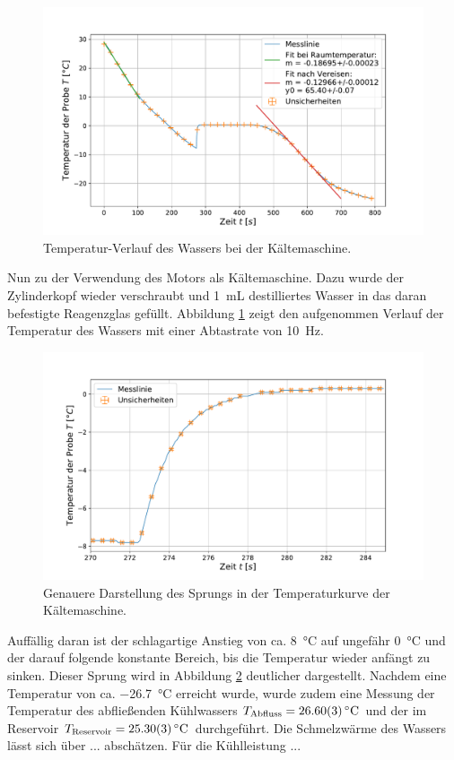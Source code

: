 	\begin{figure}[ht]
		\centering
		\includegraphics[width=\textwidth]{data/kalt_machen.pdf}
		\caption{Temperatur-Verlauf des Wassers bei der Kältemaschine.}
		\label{fig:Kältemaschine}	
	\end{figure}
	Nun zu der Verwendung des Motors als Kältemaschine.
	Dazu wurde der Zylinderkopf wieder verschraubt und \SI{1}{\milli\liter} destilliertes Wasser in das daran befestigte Reagenzglas gefüllt.
	Abbildung \ref{fig:Kältemaschine} zeigt den aufgenommen Verlauf der Temperatur des Wassers mit einer Abtastrate von \SI{10}{\hertz}.
	\begin{figure}[ht]
		\centering
		\includegraphics[width=\textwidth]{data/kalt_sprung.pdf}
		\caption{Genauere Darstellung des Sprungs in der Temperaturkurve der Kältemaschine.}
		\label{fig:KaltSprung}	
	\end{figure} 
	Auffällig daran ist der schlagartige Anstieg von ca. \SI{8}{\celsius} auf ungefähr \SI{0}{\celsius} und der darauf folgende konstante Bereich, bis die Temperatur wieder anfängt zu sinken.
	Dieser Sprung wird in Abbildung \ref{fig:KaltSprung} deutlicher dargestellt.
	Nachdem eine Temperatur von ca. \SI{-26,7}{\celsius} erreicht wurde, wurde zudem eine Messung der Temperatur des abfließenden Kühlwassers $T_\text{Abfluss} = \SI{26,6+-0,03}{\celsius}$ und der im Reservoir $T_\text{Reservoir} = \SI{25,3+-0,03}{\celsius}$ durchgeführt.
	Die Schmelzwärme des Wassers lässt sich über ... abschätzen. %
	Für die Kühlleistung ...%
	
